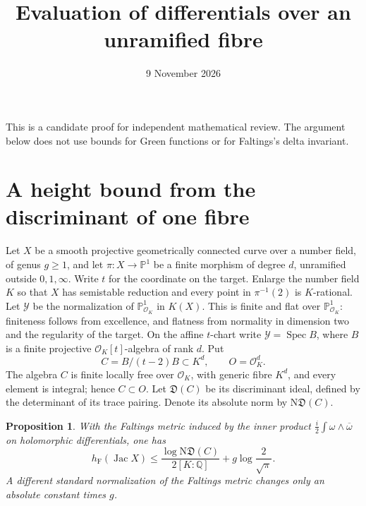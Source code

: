 \documentclass[11pt]{article}
\title{Evaluation of differentials over an unramified fibre}
\author{}\date{9 November 2026}
\newtheorem{proposition}[theorem]{Proposition}
\newcommand{\Q}{\mathbb Q}
\newcommand{\hF}{h_{\mathrm F}}
\newcommand{\OK}{\mathcal O_K}
\begin{document}
\maketitle

\noindent This is a candidate proof for independent mathematical review.
The argument below does not use bounds for Green functions or for
Faltings's delta invariant.

\section{A height bound from the discriminant of one fibre}

Let $X$ be a smooth projective geometrically connected curve over a
number field, of genus $g\geq1$, and let
$\pi:X\longrightarrow\mathbb P^1$ be a finite morphism of degree $d$,
unramified outside $0,1,\infty$. Write $t$ for the coordinate on the
target. Enlarge the number field $K$ so that $X$ has semistable
reduction and every point in $\pi^{-1}(2)$ is $K$-rational.
Let $\mathcal Y$ be the normalization of $\mathbb P^1_{\OK}$ in
$K(X)$. This is finite and flat over $\mathbb P^1_{\OK}$: finiteness
follows from excellence, and flatness from normality in dimension two
and the regularity of the target. On the affine $t$-chart write
$\mathcal Y=\operatorname{Spec}B$, where $B$ is a finite projective
$\OK[t]$-algebra of rank $d$. Put
\[
 C=B/(t-2)B\subset K^d,\qquad O=\OK^d.
\]
The algebra $C$ is finite locally free over $\OK$, with generic fibre
$K^d$, and every element is integral; hence $C\subset O$.
Let $\mathfrak D(C)$ be its discriminant ideal, defined by the
determinant of its trace pairing. Denote its absolute norm by
$\mathrm N\mathfrak D(C)$.

\begin{proposition}\label{prop:evaluation}
With the Faltings metric induced by the inner product
$\frac i2\int\omega\wedge\overline\omega$ on holomorphic
differentials, one has
\[
 \hF(\operatorname{Jac}X)
 \leq\frac{\log\mathrm N\mathfrak D(C)}{2[K:\Q]}
       +g\log\frac2{\sqrt\pi}.
\]
A different standard normalization of the Faltings metric changes
only an absolute constant times $g$.
\end{proposition}
\end{document}
